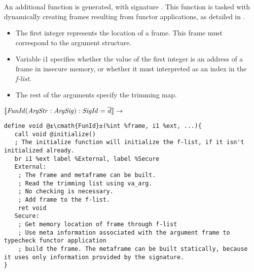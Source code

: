 An additional function is generated, with signature .
This function is tasked with dynamically creating frames resulting from functor applications, as detailed in .

\begin{itemize}
\item
The first integer represents the location of a frame. 
This frame must correspond to the argument structure.

\item
Variable i1 specifies whether the value of the first integer is an address of a frame in insecure memory, or whether it must interpreted as an index in the \emph{f-list}.

\item
The rest of the arguments specify the trimming map.
\end{itemize}

$\llbracket\mathit{FunId(ArgStr:ArgSig):SigId = \overline{d}}\rrbracket \rightarrow$

\begin{lstlisting}[language={[x86masm]Assembler}]
define void @±\cmath{FunId}±(%int %frame, i1 %ext, ...){
   call void @initialize()
   ; The initialize function will initialize the f-list, if it isn't initialized already.
   br i1 %ext label %External, label %Secure
   External:
    ; The frame and metaframe can be built.
    ; Read the trimming list using va_arg.
    ; No checking is necessary.
    ; Add frame to the f-list.
    ret void
   Secure:
    ; Get memory location of frame through f-list
    ; Use meta information associated with the argument frame to typecheck functor application
    ; build the frame. The metaframe can be built statically, because it uses only information provided by the signature.
}
\end{lstlisting}

